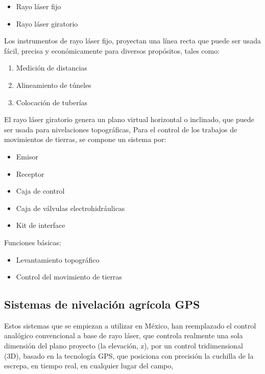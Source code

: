 \begin{itemize}
    \item Rayo láser fijo
    \item Rayo láser giratorio
\end{itemize}
Los instrumentos de rayo láser fijo, proyectan una línea recta que puede ser usada fácil, precisa y económicamente para diversos propósitos, tales como:
\begin{enumerate}
    \item Medición de distancias
    \item Alineamiento de túneles
    \item Colocación de tuberías
\end{enumerate}
El rayo láser giratorio genera un plano virtual horizontal o inclinado, que puede ser usada para nivelaciones topográficas, Para el control de los trabajos de movimientos de tierras, se compone un sistema por:
\begin{itemize}
    \item Emisor
    \item Receptor
    \item Caja de control
    \item Caja de válvulas electrohidráulicas
    \item Kit de interface
\end{itemize}
Funciones básicas:
\begin{itemize}
    \item Levantamiento topográfico
    \item Control del movimiento de tierras
\end{itemize}
\subsection{Sistemas de nivelación agrícola GPS}
Estos sistemas que se empiezan a utilizar en México, han reemplazado el control analógico convencional a base de rayo láser, que controla realmente una sola dimensión del plano proyecto (la elevación, z), por un control tridimensional (3D), basado en la tecnología GPS, que posiciona con precisión la cuchilla de la escrepa, en tiempo real, en cualquier lugar del campo,

